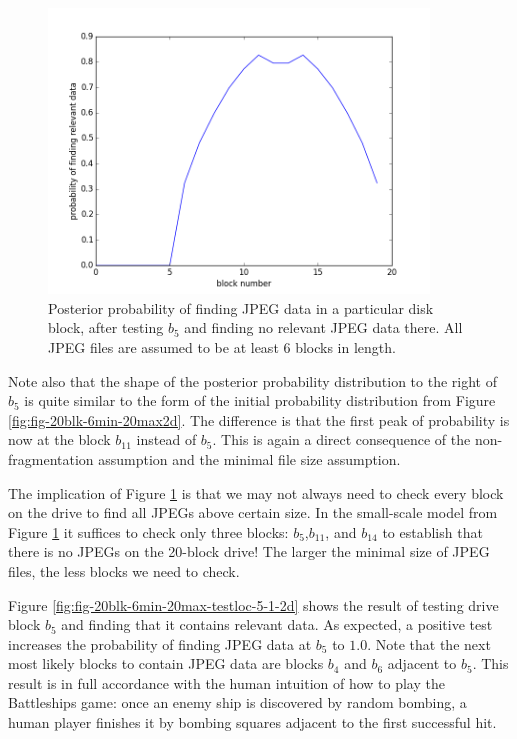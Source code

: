 \documentclass[final,5p,times,twocolumn,authoryear]{elsarticle}
\begin{document}
\begin{figure}
  \centerline{\includegraphics[width=0.9\textwidth]{fig-20blk-6min-20max-testloc-5-0-2d}}
  \caption{Posterior probability of finding JPEG data in a particular disk block, after testing $b_5$ and finding no relevant JPEG data there. All JPEG files are assumed to be at least 6 blocks in length.}
  \label{fig:fig-20blk-6min-20max-testloc-5-0-2d}
\end{figure}

Note also that the shape of the posterior probability distribution to the right of $b_5$ is quite similar to the form of the initial probability distribution from Figure \ref{fig:fig-20blk-6min-20max2d}. The difference is that the first peak of probability is now at the block $b_{11}$ instead of $b_{5}$. This is again a direct consequence of the non-fragmentation assumption and the minimal file size assumption. 

The implication of Figure \ref{fig:fig-20blk-6min-20max-testloc-5-0-2d} is that we may not always need to check every block on the drive to find all JPEGs above certain size. In the small-scale model from Figure \ref{fig:fig-20blk-6min-20max-testloc-5-0-2d} it suffices to check only three blocks: $b_5$,$b_{11}$, and $b_{14}$ to establish that there is no JPEGs on the 20-block drive! The larger the minimal size of JPEG files, the less blocks we need to check.

Figure \ref{fig:fig-20blk-6min-20max-testloc-5-1-2d} shows the result of testing drive block $b_5$ and finding that it contains relevant data. As expected, a positive test increases the probability of finding JPEG data at $b_5$ to $1.0$. Note that the next most likely blocks to contain JPEG data are blocks $b_4$ and $b_6$ adjacent to $b_5$. This result is in full accordance with the human intuition of how to play the Battleships game: once an enemy ship is discovered by random bombing, a human player finishes it by bombing squares adjacent to the first successful hit.
\end{document}
